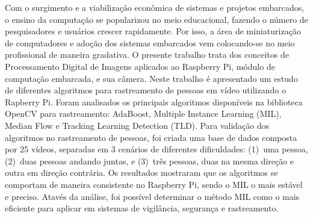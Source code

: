 \documentclass[12pt,oneside,a4paper,chapter=TITLE,section=TITLE,sumario=tradicional]{abntex2}
\begin{document}

\imprimircapa
\imprimirfolhaderosto

\begin{resumo}
Com o surgimento e a viabilização econômica de sistemas e projetos embarcados, o ensino da computação se popularizou no meio educacional, fazendo o número de pesquisadores e usuários crescer rapidamente. Por isso, a área de miniaturização de computadores e adoção dos sistemas embarcados vem colocando-se no meio profissional de maneira gradativa. O presente trabalho trata dos conceitos de Processamento Digital de Imagens aplicados ao Raspberry Pi, módulo de computação embarcada, e sua câmera. 
Neste trabalho é apresentado um estudo de diferentes algoritmos para rastreamento de pessoas em vídeo utilizando o Rapberry Pi. Foram analisados os principais algoritmos disponíveis na biblioteca OpenCV para rastreamento: AdaBoost, Multiple Instance Learning (MIL), Median Flow e Tracking Learning Detection (TLD).
Para validação dos algoritmos no rastreamento de pessoas, foi criada uma base de dados composta por 25 vídeos, separadas em 3 cenários de diferentes dificuldades: (1)~uma pessoa, (2)~duas pessoas andando juntas, e (3)~três pessoas, duas na mesma direção e outra em direção contrária. Os resultados mostraram que os algoritmos se comportam de maneira consistente no Raspberry Pi, sendo o MIL o mais estável e preciso.
Atavés da análise, foi possível determinar o método MIL como o mais eficiente para aplicar em sistemas de vigilância, segurança e rastreamento.

\end{resumo}

\listadefiguras
\listadegraficos
\listadequadros
\listadecodigos
\end{document}
